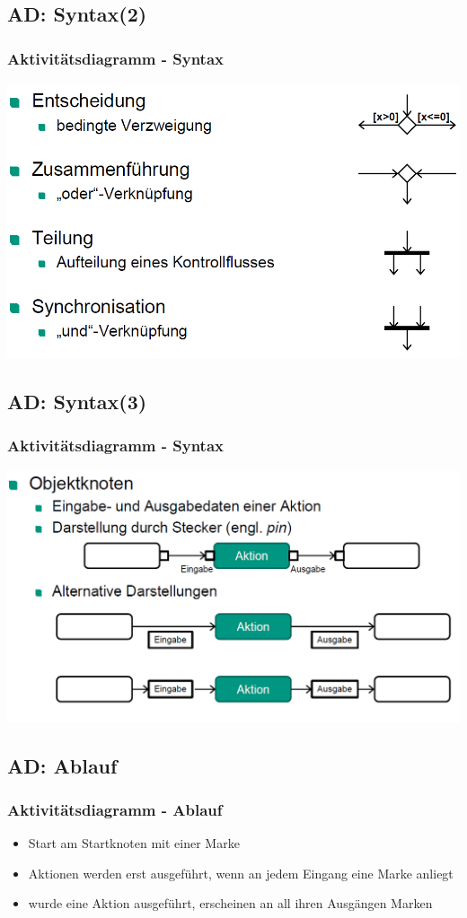 \documentclass[18pt]{beamer}
\begin{document}
	\subsection{AD: Syntax(2)}
	\begin{frame}
		\frametitle{Aktivitätsdiagramm - Syntax}
		\includegraphics[scale=0.45]{./pics/tut2/act_syn2.png}
	\end{frame}

	\subsection{AD: Syntax(3)}
	\begin{frame}
		\frametitle{Aktivitätsdiagramm - Syntax}
		\includegraphics[scale=0.45]{./pics/tut2/act_syn3.png}
	\end{frame}

	\subsection{AD: Ablauf}
	\begin{frame}
		\frametitle{Aktivitätsdiagramm - Ablauf}
		\begin{itemize}
			\item Start am Startknoten mit einer Marke
			\item Aktionen werden erst ausgeführt, wenn an jedem Eingang eine Marke anliegt
			\item wurde eine Aktion ausgeführt, erscheinen an all ihren Ausgängen Marken
		\end{itemize}
	\end{frame}
\end{document}

